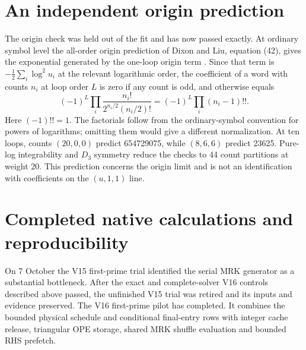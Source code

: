 \documentclass[11pt]{article}
\begin{document}
\section{An independent origin prediction}
The origin check was held out of the fit and has now passed exactly. At ordinary
symbol level the all-order origin prediction of Dixon and Liu, equation
(42), gives the exponential generated by the one-loop origin term
\cite{dixonliu}. Since that term is
$-\tfrac12\sum_i\log^2u_i$ at the relevant logarithmic order, the coefficient
of a word with counts $n_i$ at loop order $L$ is zero if any count is odd,
and otherwise equals
\begin{equation}
 (-1)^L\prod_i\frac{n_i!}{2^{n_i/2}(n_i/2)!}
 =(-1)^L\prod_i(n_i-1)!! .
\end{equation}
Here $(-1)!!=1$. The factorials follow from the ordinary-symbol convention
for powers of logarithms; omitting them would give a different
normalization. At ten loops, counts $(20,0,0)$ predict 654729075, while
$(8,6,6)$ predict 23625. Pure-log integrability and $D_3$ symmetry reduce the
checks to 44 count partitions at weight 20. This prediction concerns the
origin limit and is not an identification with coefficients on the
$(u,1,1)$ line.

\section{Completed native calculations and reproducibility}
On 7 October the V15 first-prime trial identified the serial MRK generator
as a substantial bottleneck. After the exact and complete-solver V16
controls described above passed, the unfinished V15 trial was retired and
its inputs and evidence preserved. The V16 first-prime pilot has completed. It combines
the bounded physical schedule and conditional final-entry rows with integer
cache release, triangular OPE storage, shared MRK shuffle evaluation and
bounded RHS prefetch.
\end{document}
